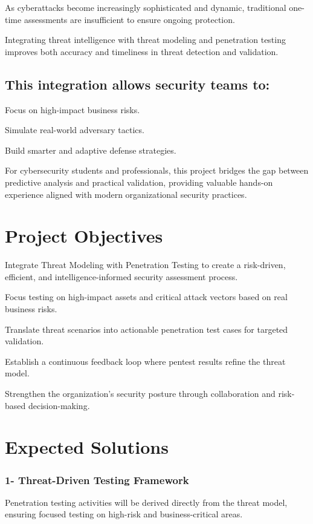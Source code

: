 \documentclass[12pt,a4paper]{report}
\begin{document}
As cyberattacks become increasingly sophisticated and dynamic, traditional one-time assessments are insufficient to ensure ongoing protection.

Integrating threat intelligence with threat modeling and penetration testing improves both accuracy and timeliness in threat detection and validation.

\subsection{This integration allows security teams to:}

Focus on high-impact business risks.

Simulate real-world adversary tactics.

Build smarter and adaptive defense strategies.

For cybersecurity students and professionals, this project bridges the gap between predictive analysis and practical validation, providing valuable hands-on experience aligned with modern organizational security practices.

\section{Project Objectives}

Integrate Threat Modeling with Penetration Testing to create a risk-driven, efficient, and intelligence-informed security assessment process.

Focus testing on high-impact assets and critical attack vectors based on real business risks.

Translate threat scenarios into actionable penetration test cases for targeted validation.

Establish a continuous feedback loop where pentest results refine the threat model.

Strengthen the organization’s security posture through collaboration and risk-based decision-making.

\section{Expected Solutions}

\subsubsection{1- Threat-Driven Testing Framework}

Penetration testing activities will be derived directly from the threat model, ensuring focused testing on high-risk and business-critical areas.
\end{document}
